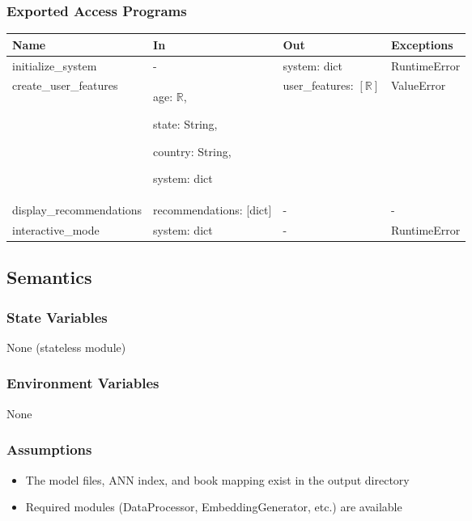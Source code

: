 \documentclass[12pt, titlepage]{article}
\begin{document}
\subsubsection{Exported Access Programs}

\begin{center}
  \begin{tabular}{p{5cm} p{4cm} p{4cm} p{2cm}}
  \hline
  \textbf{Name} & \textbf{In} & \textbf{Out} & \textbf{Exceptions} \\
  \hline
  initialize\_system & - & system: dict & RuntimeError \\
  \hline
  create\_user\_features & age: $\mathbb{R}$,
  
  state: String,
  
  country: String,
  
  system: dict & user\_features: $[\mathbb{R}]$ & ValueError \\
  \hline
  display\_recommendations & recommendations: [dict] & - & - \\
  \hline
  interactive\_mode & system: dict & - & RuntimeError \\
  \hline
  \end{tabular}
\end{center}

\subsection{Semantics}

\subsubsection{State Variables}
None (stateless module)

\subsubsection{Environment Variables}
None

\subsubsection{Assumptions}
\begin{itemize}
  \item The model files, ANN index, and book mapping exist in the output directory
  \item Required modules (DataProcessor, EmbeddingGenerator, etc.) are available
\end{itemize}
\end{document}
